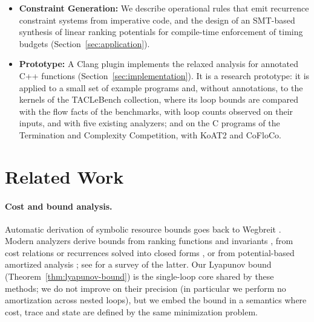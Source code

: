 \documentclass[oneside,english]{amsart}
\numberwithin{equation}{section}
\numberwithin{figure}{section}
\theoremstyle{plain}
\theoremstyle{definition}
\theoremstyle{plain}
\theoremstyle{remark}
\theoremstyle{plain}
\theoremstyle{definition}
\theoremstyle{plain}
\theoremstyle{remark}
\newcommand{\lean}[1]{{\ttfamily\small #1}}
\begin{document}
\begin{itemize}
    in Lean~4 \cite{demoura2021lean4} on top of mathlib \cite{mathlib2020}, without \lean{sorry} and without any axiom
    beyond the three standard axioms of Lean's logic (Section~\ref{sec:mechanization}).
    \item \textbf{Constraint Generation:} We describe operational rules that emit recurrence constraint systems from
    imperative code, and the design of an SMT-based synthesis of linear ranking potentials for compile-time
    enforcement of timing budgets (Section~\ref{sec:application}).
    \item \textbf{Prototype:} A Clang plugin implements the relaxed analysis for annotated C++ functions
    (Section~\ref{sec:implementation}). It is a research prototype: it is applied to a small set of example
    programs and, without annotations, to the kernels of the TACLeBench collection, where its loop bounds are
    compared with the flow facts of the benchmarks, with loop counts observed on their inputs, and with five existing analyzers; and on the C programs of the Termination and Complexity Competition, with KoAT2 and CoFloCo.
\end{itemize}

\section{Related Work}
\label{sec:related}

\paragraph{Cost and bound analysis.}
Automatic derivation of symbolic resource bounds goes back to Wegbreit \cite{wegbreit1975mechanical}.
Modern analyzers derive bounds from ranking functions and invariants
\cite{gulwani2009speed,alias2010multi,sinn2014complexity,brockschmidt2016analyzing,lommen2022automatic}, from cost
relations or recurrences solved into closed forms \cite{albert2011closed,kincaid2019closed}, or from potential-based
amortized analysis \cite{hoffmann2012multivariate,carbonneaux2015compositional}; see \cite{hoffmann2022two} for a survey of
the latter. Our Lyapunov bound (Theorem~\ref{thm:lyapunov-bound})
is the single-loop core shared by these methods; we do not improve on their precision (in particular we perform no
amortization across nested loops), but we embed the bound in a semantics where cost, trace and state are
defined by the same minimization problem.
\end{document}
